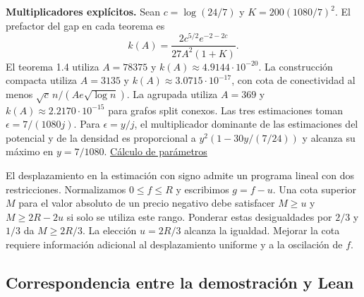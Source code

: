 \documentclass[spanish,11pt,a4paper]{article}
\begin{document}
\textbf{Multiplicadores explícitos.} Sean \(c=\log(24/7)\) y \(K=200(1080/7)^2\). El prefactor del gap en cada teorema es \[k(A)=\frac{2c^{5/2}e^{-2-2c}}{27A^2(1+K)}.\] El teorema 1.4 utiliza \(A=78375\) y \(k(A)\approx4.9144\cdot10^{-20}\). La construcción compacta utiliza \(A=3135\) y \(k(A)\approx3.0715\cdot10^{-17}\), con cota de conectividad al menos \(\sqrt c\,n/(Ae\sqrt{\log n})\). La agrupada utiliza \(A=369\) y \(k(A)\approx2.2170\cdot10^{-15}\) para grafos split conexos. Las tres estimaciones toman \(\epsilon=7/(1080j)\). Para \(\epsilon=y/j\), el multiplicador dominante de las estimaciones del potencial y de la densidad es proporcional a \(y^2(1-30y/(7/24))\) y alcanza su máximo en \(y=7/1080\). \href{https://github.com/jtraverso/split-clique-partition-gap/blob/ccb5444b2ecdff9de1d6221133633a25a224953d/R434/PolylogOrder.lean}{Cálculo de parámetros}

El desplazamiento en la estimación con signo admite un programa lineal con dos restricciones. Normalizamos \(0\le f\le R\) y escribimos \(g=f-u\). Una cota superior \(M\) para el valor absoluto de un precio negativo debe satisfacer \(M\ge u\) y \(M\ge 2R-2u\) si solo se utiliza este rango. Ponderar estas desigualdades por \(2/3\) y \(1/3\) da \(M\ge2R/3\). La elección \(u=2R/3\) alcanza la igualdad. Mejorar la cota requiere información adicional al desplazamiento uniforme y a la oscilación de \(f\).

\subsection{Correspondencia entre la demostración y Lean}\label{correspondencia-entre-la-demostraciuxf3n-y-lean}
\end{document}
